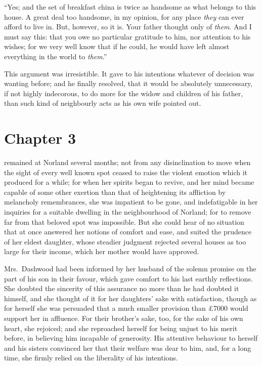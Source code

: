 ``Yes; and the set of breakfast china is twice
as handsome as what belongs to this house.  A great
deal too handsome, in my opinion, for any place \emph{they}
can ever afford to live in.  But, however, so it is.
Your father thought only of \emph{them}.  And I must say this:
that you owe no particular gratitude to him, nor attention
to his wishes; for we very well know that if he could,
he would have left almost everything in the world to \emph{them}.''

This argument was irresistible.  It gave to his
intentions whatever of decision was wanting before; and he
finally resolved, that it would be absolutely unnecessary,
if not highly indecorous, to do more for the widow
and children of his father, than such kind of neighbourly
acts as his own wife pointed out.



\chapter{Chapter 3}


 remained at Norland several months;
not from any disinclination to move when the sight of every
well known spot ceased to raise the violent emotion which it
produced for a while; for when her spirits began to revive,
and her mind became capable of some other exertion than that
of heightening its affliction by melancholy remembrances,
she was impatient to be gone, and indefatigable in her inquiries
for a suitable dwelling in the neighbourhood of Norland;
for to remove far from that beloved spot was impossible.
But she could hear of no situation that at once answered
her notions of comfort and ease, and suited the prudence
of her eldest daughter, whose steadier judgment rejected
several houses as too large for their income, which her
mother would have approved.

Mrs.\ Dashwood had been informed by her husband of the
solemn promise on the part of his son in their favour,
which gave comfort to his last earthly reflections.
She doubted the sincerity of this assurance no more than he
had doubted it himself, and she thought of it for her daughters'
sake with satisfaction, though as for herself she was
persuaded that a much smaller provision than \pounds 7000 would
support her in affluence.  For their brother's sake, too,
for the sake of his own heart, she rejoiced; and she
reproached herself for being unjust to his merit before,
in believing him incapable of generosity.  His attentive
behaviour to herself and his sisters convinced her that
their welfare was dear to him, and, for a long time,
she firmly relied on the liberality of his intentions.

